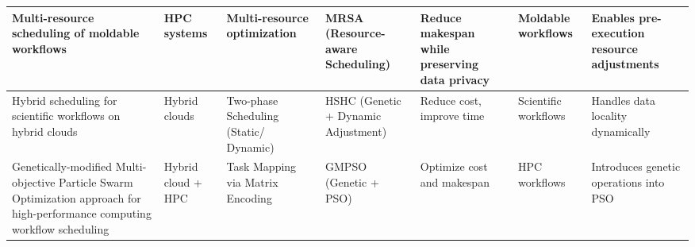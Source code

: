 \documentclass[a4paper, final]{article}
\begin{document}
\begin{table}[H]
\begin{tabularx}{\textwidth}{|p{3.5cm}|X|X|p{2cm}|X|X|X|}
    Multi-resource scheduling of moldable workflows \cite{bib:8} &
    HPC systems &
    Multi-resource optimization &
    MRSA (Resource-aware Scheduling) &
    Reduce makespan while preserving data privacy &
    Moldable workflows &
    Enables pre-execution resource adjustments \\
    \hline

    
    Hybrid scheduling for scientific workflows on hybrid clouds \cite{bib:9} &
    Hybrid clouds &
    Two-phase Scheduling (Static/ Dynamic) &
    HSHC (Genetic + Dynamic Adjustment) &
    Reduce cost, improve time &
    Scientific workflows &
    Handles data locality dynamically \\
    \hline

    Genetically-modified Multi-objective Particle Swarm Optimization approach for 
    high-performance computing workflow scheduling \cite{bib:10} &
    Hybrid cloud + HPC &
    Task Mapping via Matrix Encoding &
    GMPSO (Genetic + PSO) &
    Optimize cost and makespan &
    HPC workflows &
    Introduces genetic operations into PSO \\
    \hline
    \end{tabularx}
\end{table}

\cleardoublepage
{}
\newpage
{}
\end{document}
